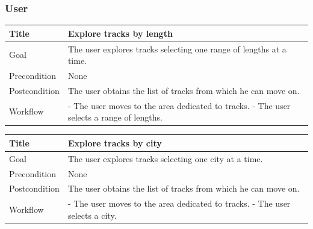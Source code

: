 \documentclass{beamer}
\begin{document}
\begin{frame}
    \frametitle{User}
    \begin{table}
        \tiny
        \begin{tabular}{|p{2cm}|p{6cm}|}
        \hline
        Title & \textbf{Explore tracks by length} \\
        \hline
        Goal & The user explores tracks selecting one range of lengths at a time. \\
        \hline
        Precondition & None \\
        \hline
        Postcondition & The user obtains the list of tracks from which he can move on.\\
        \hline
        Workflow &
        - The user moves to the area dedicated to tracks. \newline
        - The user selects a range of lengths. \\
        \hline
        \end{tabular}
\end{table}

\begin{table}
    \tiny
    \begin{tabular}{|p{2cm}|p{6cm}|}
    \hline
    Title & \textbf{Explore tracks by city} \\
    \hline
    Goal & The user explores tracks selecting one city at a time. \\
    \hline
    Precondition & None \\
    \hline
    Postcondition & The user obtains the list of tracks from which he can move on.\\
    \hline
    Workflow &
    - The user moves to the area dedicated to tracks. \newline
    - The user selects a city. \\
    \hline
    \end{tabular}
\end{table}
\end{frame}


\end{document}
